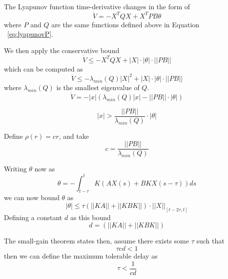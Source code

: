 \documentclass[conference]{IEEEtran}
\begin{document}
The Lyapunov function time-derivative changes in the form of 
\begin{equation}
\dot{V}=-X^TQX+X^TPB\theta
\end{equation} where $P$ and $Q$ are the same functions defined above in Equation ~\ref{eq:lyapunovP}.

We then apply the conservative bound 
\begin{equation}
\dot{V}\leq-X^TQX+|X|\cdot|\theta|\cdot||PB||
\end{equation}
which can be computed as
\begin{equation}
\dot{V}\leq-\lambda_{min}\left(Q\right)|X|^2+|X|\cdot|\theta|\cdot||PB||
\label{eq:smallGainConservativeBound}
\end{equation} where $\lambda_{min}\left(Q\right)$ is the smallest eigenvalue of $Q$.
\begin{equation}
\dot{V}=-|x|\left(\lambda_{min}\left(Q\right)|x|-||PB||\cdot|\theta|\right)
\end{equation}

\begin{equation}
|x|>\frac{||PB||}{\lambda_{min}\left(Q\right)}\cdot|\theta|
\end{equation}

Define $\rho\left(r\right)=cr$, and take 
\begin{equation}
c=\frac{||PB||}{\lambda_{min}\left(Q\right)}
\end{equation}

Writing $\theta$ now as 
\begin{equation}
\theta=-\int^{t}_{t-\tau}K\left(AX\left(s\right)+BKX\left(s-\tau\right)\right)ds
\end{equation} we can now bound $\theta$ as 
\begin{equation}
|\theta|\leq\tau\left(||KA||+||KBK||\right)\cdot||X||_{\left[t-2\tau,t\right]}
\end{equation}
Defining a constant $d$ as this bound 
\begin{equation}
d=(||KA||+||KBK||)
\end{equation} 

The small-gain theorem states then, assume there exists some $\tau$ such that
\begin{equation}
\tau cd<1
\end{equation}
then we can define the maximum tolerable delay as 
\begin{equation}
\tau<\frac{1}{cd}
\end{equation}
\end{document}
